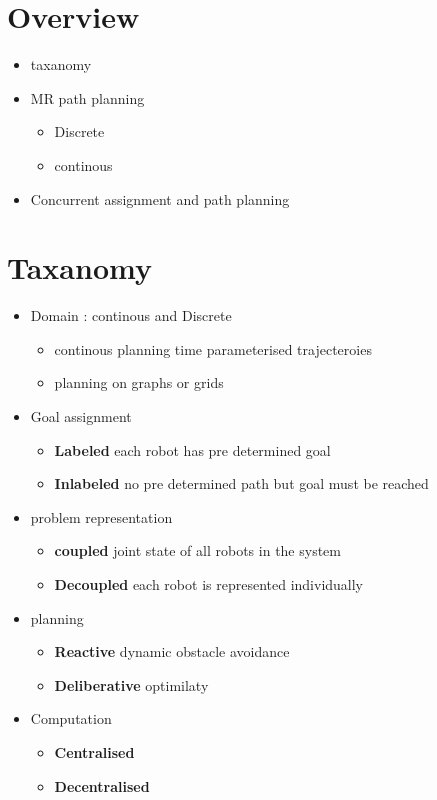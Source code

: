 \documentclass[a4paper]{article}
\begin{document}
   \section{Overview} 
   \begin{itemize}
       \item taxanomy
       \item MR path planning 
           \begin{itemize}
               \item Discrete
               \item continous
           \end{itemize}
        \item Concurrent assignment and path planning 
   \end{itemize}
   \section{Taxanomy}
   \begin{itemize}
       \item Domain : continous and Discrete 
           \begin{itemize}
               \item continous planning time parameterised trajecteroies
               \item planning on graphs or grids
           \end{itemize}
       \item Goal assignment 
           \begin{itemize}
               \item \textbf{Labeled} each robot has pre determined goal 
               \item \textbf{Inlabeled} no pre determined path but goal must be reached
           \end{itemize}
       \item problem representation
           \begin{itemize}
               \item \textbf{coupled} joint state of all robots in the system
               \item \textbf{Decoupled} each robot is represented individually
           \end{itemize}
       \item planning
           \begin{itemize}
               \item \textbf{Reactive} dynamic obstacle avoidance
               \item \textbf{Deliberative} optimilaty 
           \end{itemize}
        \item Computation
            \begin{itemize}
                \item \textbf{Centralised}
                \item \textbf{Decentralised}
            \end{itemize}
   \end{itemize}
\end{document}
